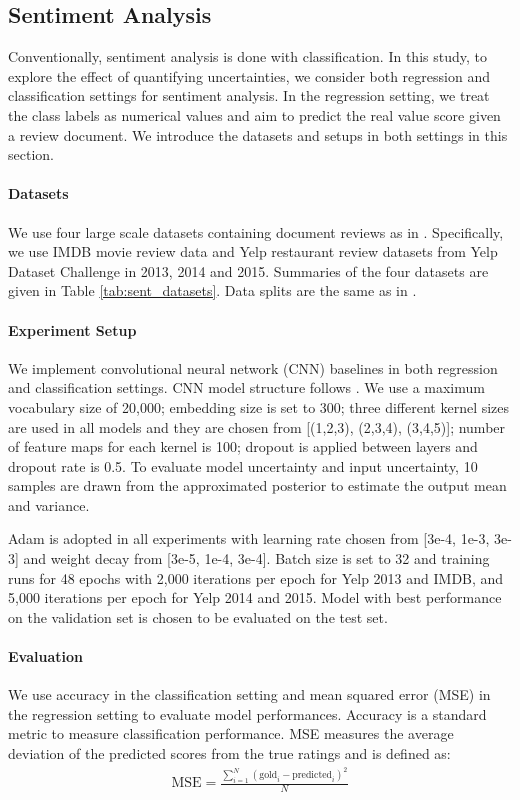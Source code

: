 \documentclass[letterpaper]{article} %
\begin{document}
\subsection{Sentiment Analysis}
Conventionally, sentiment analysis is done with classification. In this study, to explore the effect of quantifying uncertainties, we consider both regression and classification settings for sentiment analysis. In the regression setting, we treat the class labels as numerical values and aim to predict the real value score given a review document. We introduce the datasets and setups in both settings in this section.

\paragraph{Datasets} We use four large scale datasets containing document reviews as in \cite{tang2015document}. Specifically, we use IMDB movie review data \cite{diao2014jointly} and Yelp restaurant review datasets
from Yelp Dataset Challenge in 2013, 2014 and 2015. Summaries of the four datasets are given in Table \ref{tab:sent_datasets}. Data splits are the same as in \cite{tang2015document,diao2014jointly}.

\paragraph{Experiment Setup} We implement convolutional neural network (CNN) baselines in both regression and classification settings. CNN model structure follows \cite{kim2014convolutional}. We use a maximum vocabulary size of 20,000; embedding size is set to 300; three different kernel sizes are used in all models and they are chosen from [(1,2,3), (2,3,4), (3,4,5)]; number of feature maps for each kernel is 100; dropout \cite{srivastava2014dropout} is applied between layers and dropout rate is 0.5. To evaluate model uncertainty and input uncertainty, 10 samples are drawn from the approximated posterior to estimate the output mean and variance.

Adam \cite{kingma2014adam} is adopted in all experiments with learning rate chosen from [3e-4, 1e-3, 3e-3] and weight decay from [3e-5, 1e-4, 3e-4]. Batch size is set to 32 and training runs for 48 epochs with 2,000 iterations per epoch for Yelp 2013 and IMDB, and 5,000 iterations per epoch for Yelp 2014 and 2015. Model with best performance on the validation set is chosen to be evaluated on the test set.

\paragraph{Evaluation}
We use accuracy in the classification setting and mean squared error (MSE) in the regression setting to evaluate model performances. Accuracy is a standard metric to measure classification performance. MSE measures the average deviation of the predicted scores from the true ratings and is defined as:
\begin{align}
\text{MSE}=\frac{\sum_{i=1}^N(\text{gold}_i-\text{predicted}_i)^2}{N}
\end{align}
\end{document}
